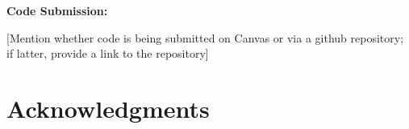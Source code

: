 \documentclass[twoside,11pt]{article}
\renewcommand{\>}{{\rightarrow}}
\newcommand{\1}{{\mathbf 1}}
\newcommand{\0}{{\mathbf 0}}
\begin{document}
\vspace{12pt}

\textbf{Code Submission:}

[Mention whether code is being submitted on Canvas or via a github repository; if latter, provide a link to the repository]


\newpage














\section*{Acknowledgments}






\end{document}
